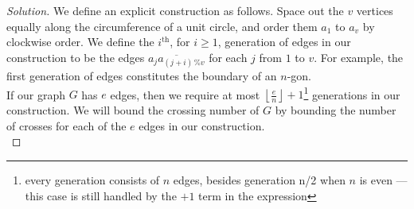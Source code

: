 \documentclass[11pt]{article}
\newenvironment{solution}
  {\renewcommand\qedsymbol{$\blacksquare$}\begin{proof}[Solution]}
  {\end{proof}}
\begin{document}
\begin{enumerate}
    
\begin{solution}
We define an explicit construction as follows. Space out the $v$ vertices equally along the circumference of a unit circle, and order them  $a_1$ to $a_v$ by clockwise order. We define the $i^{\text{th}}$, for $i \geq 1$, generation of edges in our construction to be the edges $\overline{a_{j} a_{(j+i) \, \% v}}$ for each $j$ from $1$ to $v$. For example, the first generation of edges constitutes the boundary of an $n$-gon.\\

If our graph $G$ has $e$ edges, then we require at most  $\left\lfloor\frac{e}{n}\right\rfloor + 1$\footnote{every generation consists of $n$ edges, besides generation n/2 when $n$ is even — this case is still handled by the $+1$ term in the expression} generations in our construction. We will bound the crossing number of $G$ by bounding the number of crosses for each of the $e$ edges in our construction.  \\


\end{solution}
\end{enumerate}
\end{document}
